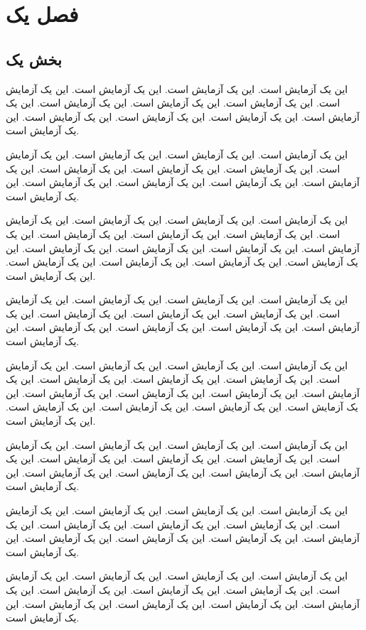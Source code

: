 \documentclass[twocolumn]{book}
\begin{document}
\tableofcontents
\chapter{فصل یک}
\section{بخش یک}
این یک آزمایش است. این یک آزمایش است. این یک آزمایش است. این یک آزمایش است. 
این یک آزمایش است. این یک آزمایش است. این یک آزمایش است. این یک آزمایش است. 
این یک آزمایش است. این یک آزمایش است. این یک آزمایش است. این یک آزمایش است. 

این یک آزمایش است. این یک آزمایش است. این یک آزمایش است. این یک آزمایش است. 
این یک آزمایش است. این یک آزمایش است. این یک آزمایش است. این یک آزمایش است. 
این یک آزمایش است. این یک آزمایش است. این یک آزمایش است. این یک آزمایش است. 

این یک آزمایش است. این یک آزمایش است. این یک آزمایش است. این یک آزمایش است. 
این یک آزمایش است. این یک آزمایش است. این یک آزمایش است. این یک آزمایش است. 
این یک آزمایش است. این یک آزمایش است. این یک آزمایش است. این یک آزمایش است. 
این یک آزمایش است. این یک آزمایش است. این یک آزمایش است. این یک آزمایش است. 

این یک آزمایش است. این یک آزمایش است. این یک آزمایش است. این یک آزمایش است. 
این یک آزمایش است. این یک آزمایش است. این یک آزمایش است. این یک آزمایش است. 
این یک آزمایش است. این یک آزمایش است. این یک آزمایش است. این یک آزمایش است. 

این یک آزمایش است. این یک آزمایش است. این یک آزمایش است. این یک آزمایش است. 
این یک آزمایش است. این یک آزمایش است. این یک آزمایش است. این یک آزمایش است. 
این یک آزمایش است. این یک آزمایش است. این یک آزمایش است. این یک آزمایش است. 
این یک آزمایش است. این یک آزمایش است. این یک آزمایش است. این یک آزمایش است. 

این یک آزمایش است. این یک آزمایش است. این یک آزمایش است. این یک آزمایش است. 
این یک آزمایش است. این یک آزمایش است. این یک آزمایش است. این یک آزمایش است. 
این یک آزمایش است. این یک آزمایش است. این یک آزمایش است. این یک آزمایش است. 

این یک آزمایش است. این یک آزمایش است. این یک آزمایش است. این یک آزمایش است. 
این یک آزمایش است. این یک آزمایش است. این یک آزمایش است. این یک آزمایش است. 
این یک آزمایش است. این یک آزمایش است. این یک آزمایش است. این یک آزمایش است. 

این یک آزمایش است. این یک آزمایش است. این یک آزمایش است. این یک آزمایش است. 
این یک آزمایش است. این یک آزمایش است. این یک آزمایش است. این یک آزمایش است. 
این یک آزمایش است. این یک آزمایش است. این یک آزمایش است. این یک آزمایش است. 
\end{document}

